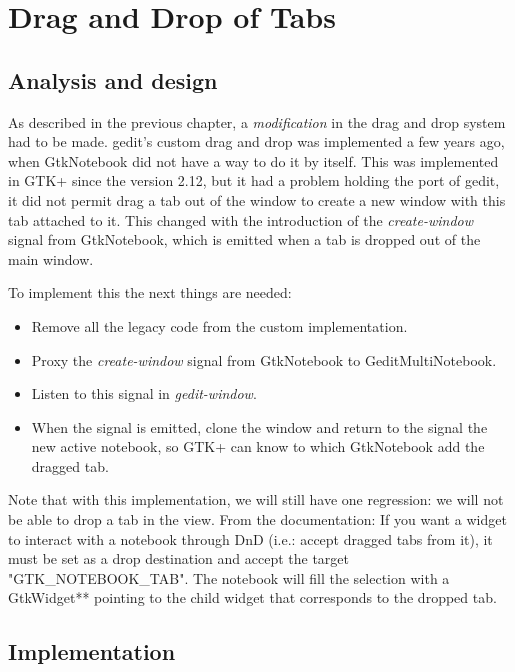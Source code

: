
\chapter{Drag and Drop of Tabs}\label{chap:DND}


\section{Analysis and design}

As described in the previous chapter, a \emph{modification} in the drag and drop system had to be made. gedit's custom drag and drop was implemented a few years ago, when GtkNotebook did not have a way to do it by itself. This was implemented in GTK+ since the version 2.12, but it had a problem holding the port of gedit, it did not permit drag a tab out of the window to create a new window with this tab attached to it. This changed with the introduction of the \emph{create-window} signal from GtkNotebook, which is emitted when a tab is dropped out of the main window.

To implement this the next things are needed:
\begin{itemize}
  \item Remove all the legacy code from the custom implementation.
  \item Proxy the \emph{create-window} signal from GtkNotebook to GeditMultiNotebook.
  \item Listen to this signal in \emph{gedit-window}.
  \item When the signal is emitted,  clone the window and return to the signal the new active notebook, so GTK+ can know to which GtkNotebook add the dragged tab.
\end{itemize}

Note that with this implementation,  we will still have one regression: we will not be able to drop a tab in the view. From the documentation: If you want a widget to interact with a notebook through DnD (i.e.: accept dragged tabs from it),  it must be set as a drop destination and accept the target "GTK\_NOTEBOOK\_TAB". The notebook will fill the selection with a GtkWidget** pointing to the child widget that corresponds to the dropped tab.

\section{Implementation}

